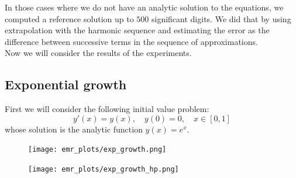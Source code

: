 
In those cases where we do not have an analytic solution to the equations, we computed a reference solution up to \(500\) significant digits. We did that by using extrapolation with the harmonic sequence and estimating the error as the difference between successive terms in the sequence of approximations.\\

Now we will consider the results of the experiments.

\subsection{Exponential growth}
First we will consider the following initial value problem:
\begin{equation}\label{42}
y'(x) = y(x),\quad y(0) = 0, \quad x\in [0,1]
\end{equation}
whose solution is the analytic function \(y(x) = e^x\).

\begin{figure}[H]
\centering
\begin{minipage}{0.45\textwidth}
\centering
\texttt{[image: emr\_plots/exp\_growth.png]}
\end{minipage}
\begin{minipage}{0.45\textwidth}
\centering
\texttt{[image: emr\_plots/exp\_growth\_hp.png]}
\end{minipage}
\end{figure}

